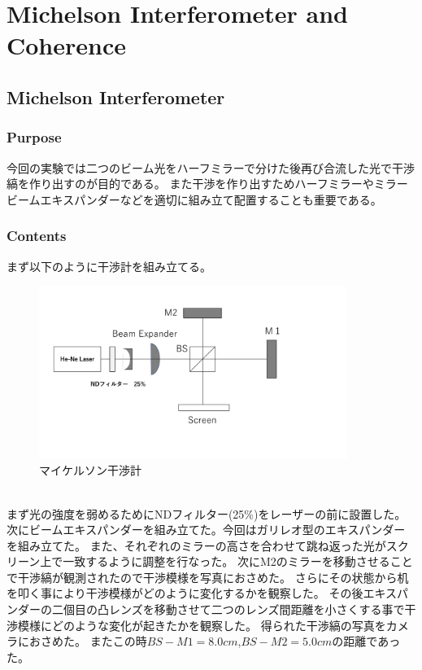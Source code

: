 \documentclass[11pt, a4paper]{jsarticle}
\begin{document}
\section{Michelson Interferometer and Coherence}
\subsection{Michelson Interferometer}
\subsubsection{Purpose}
今回の実験では二つのビーム光をハーフミラーで分けた後再び合流した光で干渉縞を作り出すのが目的である。
また干渉を作り出すためハーフミラーやミラービームエキスパンダーなどを適切に組み立て配置することも重要である。
\subsubsection{Contents}
まず以下のように干渉計を組み立てる。
\begin{figure}[htbp]
 \begin{center}
  \includegraphics[width=100mm]{fig14.png}
 \end{center}
 \caption{マイケルソン干渉計}
 \label{fig:14}
\end{figure}\\

まず光の強度を弱めるためにNDフィルター(25\%)をレーザーの前に設置した。
次にビームエキスパンダーを組み立てた。今回はガリレオ型のエキスパンダーを組み立てた。
また、それぞれのミラーの高さを合わせて跳ね返った光がスクリーン上で一致するように調整を行なった。
次にM2のミラーを移動させることで干渉縞が観測されたので干渉模様を写真におさめた。
さらにその状態から机を叩く事により干渉模様がどのように変化するかを観察した。
その後エキスパンダーの二個目の凸レンズを移動させて二つのレンズ間距離を小さくする事で干渉模様にどのような変化が起きたかを観察した。
得られた干渉縞の写真をカメラにおさめた。
またこの時$BS-M1 = 8.0cm$,$BS-M2 = 5.0cm$の距離であった。
\end{document}

